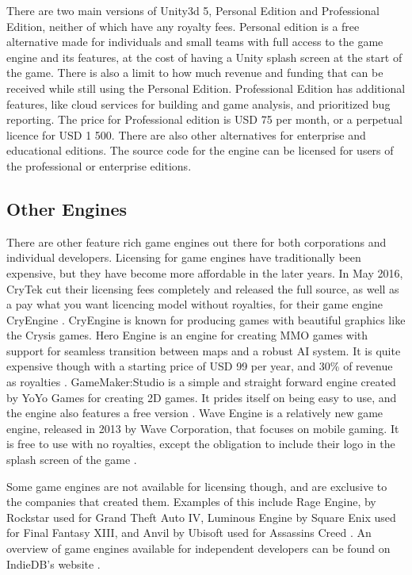 There are two main versions of Unity3d 5, Personal Edition and Professional Edition, neither of which have any royalty fees. Personal edition is a free alternative made for individuals and small teams with full access to the game engine and its features, at the cost of having a Unity splash screen at the start of the game. There is also a limit to how much revenue and funding that can be received while still using the Personal Edition. Professional Edition has additional features, like cloud services for building and game analysis, and prioritized bug reporting. The price for Professional edition is USD 75 per month, or a perpetual licence for USD 1 500. There are also other alternatives for enterprise and educational editions. The source code for the engine can be licensed for users of the professional or enterprise editions. \cite{unity2016get}

\subsection{Other Engines}
There are other feature rich game engines out there for both corporations and individual developers. Licensing for game engines have traditionally been expensive, but they have become more affordable in the later years. In May 2016, CryTek cut their licensing fees completely and released the full source, as well as a pay what you want licencing model without royalties, for their game engine CryEngine \cite{papadopoulos2016cry}. CryEngine is known for producing games with beautiful graphics like the Crysis games. 
Hero Engine is an engine for creating MMO games with support for seamless transition between maps and a robust AI system. It is quite expensive though with a starting price of USD 99 per year, and 30\% of revenue as royalties \cite{fabrik2016licence}.
GameMaker:Studio is a simple and straight forward engine created by YoYo Games for creating 2D games. It prides itself on being easy to use, and the engine also features a free version \cite{yoyo2016gamemaker}.
Wave Engine is a relatively new game engine, released in 2013 by Wave Corporation, that focuses on mobile gaming. It is free to use with no royalties, except the obligation to include their logo in the splash screen of the game \cite{wave2016engine}. 

Some game engines are not available for licensing though, and are exclusive to the companies that created them. Examples of this include Rage Engine, by Rockstar used for Grand Theft Auto IV, Luminous Engine by Square Enix used for Final Fantasy XIII, and Anvil by Ubisoft used for Assassins Creed \cite{1up2008gta, makuzawa2015final, bayer2009assassins}. An overview of game engines available for independent developers can be found on IndieDB's website \cite{indiedb2015engine}.

